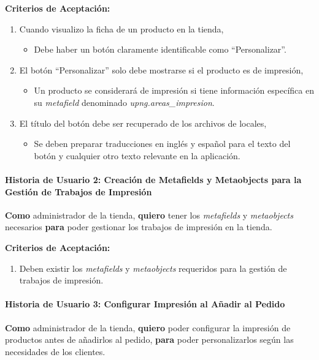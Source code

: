 \documentclass[11pt]{article}
\newcommand{\subsubsubsection}[1]{\paragraph{#1}}
\begin{document}
\vspace{0.5cm}
\textbf{Criterios de Aceptación:}
\begin{enumerate}[label=\arabic*.]
    \item Cuando visualizo la ficha de un producto en la tienda,
          \begin{itemize}[label=--]
              \item Debe haber un botón claramente identificable como ``Personalizar''.    
          \end{itemize}
    \item El botón ``Personalizar'' solo debe mostrarse si el producto es de impresión,
          \begin{itemize}[label=--]
              \item Un producto se considerará de impresión si tiene información específica en su \textit{metafield} denominado \textit{upng.areas\_impresion}.
          \end{itemize}
    \item El título del botón debe ser recuperado de los archivos de locales,
          \begin{itemize}[label=--]
              \item Se deben preparar traducciones en inglés y español para el texto del botón y cualquier otro texto relevante en la aplicación.
          \end{itemize}
\end{enumerate}


\subsubsubsection{Historia de Usuario 2: Creación de Metafields y Metaobjects para la Gestión de Trabajos de Impresión}\label{sec:historia2}

\textbf{Como} administrador de la tienda,
\textbf{quiero} tener los \textit{metafields} y \textit{metaobjects} necesarios \textbf{para} poder gestionar los trabajos de impresión en la tienda.

\vspace{0.5cm}
\textbf{Criterios de Aceptación:}
\begin{enumerate}[label=\arabic*.]
    \item Deben existir los \textit{metafields} y \textit{metaobjects} requeridos para la gestión de trabajos de impresión.
\end{enumerate}


\subsubsubsection{Historia de Usuario 3: Configurar Impresión al Añadir al Pedido}\label{sec:historia3}

\textbf{Como} administrador de la tienda, \textbf{quiero} poder configurar la impresión de productos antes de añadirlos al pedido, \textbf{para} poder personalizarlos según las necesidades de los clientes.
\end{document}
